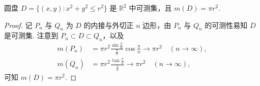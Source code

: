 \documentclass[../../main.tex]{subfiles}%
\begin{document}
\begin{example}
圆盘 \(D = \{ (x,y): x^2 + y^2 \leqslant r^2\}\) 是 \(\mathbb{R}^2\) 中可测集，且 \(m(D)=\pi r^2\).
\end{example}
\begin{proof}

记 \(P_n\) 与 \(Q_n\) 为 \(D\) 的内接与外切正 \(n\) 边形，由 \(P_n\) 与 \(Q_n\) 的可测性易知 \(D\) 是可测集. 注意到 \(P_n \subset D \subset Q_n\)，以及
\begin{align*}
m(P_n) &= \pi r^2 \frac{\sin \frac{\pi}{n}}{\frac{\pi}{n}} \cos\frac{\pi}{n} \to \pi r^2 \quad (n \to \infty),\\
m(Q_n) &= \pi r^2 \frac{\tan\frac{\pi}{n}}{\frac{\pi}{n}} \to \pi r^2 \quad (n \to \infty),
\end{align*}
可知 \(m(D)=\pi r^2\).

\end{proof}
\end{document}
